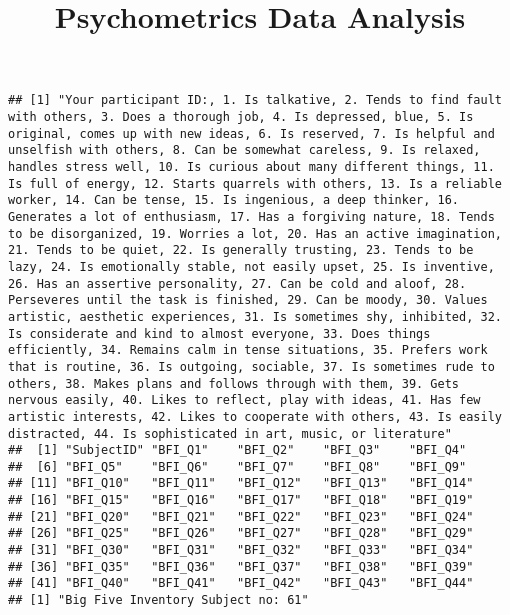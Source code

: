 \documentclass[]{article}
\title{Psychometrics Data Analysis}
\author{}
\date{}
\begin{document}
\maketitle

\newpage

\newpage

\begin{verbatim}
## [1] "Your participant ID:, 1. Is talkative, 2. Tends to find fault with others, 3. Does a thorough job, 4. Is depressed, blue, 5. Is original, comes up with new ideas, 6. Is reserved, 7. Is helpful and unselfish with others, 8. Can be somewhat careless, 9. Is relaxed, handles stress well, 10. Is curious about many different things, 11. Is full of energy, 12. Starts quarrels with others, 13. Is a reliable worker, 14. Can be tense, 15. Is ingenious, a deep thinker, 16. Generates a lot of enthusiasm, 17. Has a forgiving nature, 18. Tends to be disorganized, 19. Worries a lot, 20. Has an active imagination, 21. Tends to be quiet, 22. Is generally trusting, 23. Tends to be lazy, 24. Is emotionally stable, not easily upset, 25. Is inventive, 26. Has an assertive personality, 27. Can be cold and aloof, 28. Perseveres until the task is finished, 29. Can be moody, 30. Values artistic, aesthetic experiences, 31. Is sometimes shy, inhibited, 32. Is considerate and kind to almost everyone, 33. Does things efficiently, 34. Remains calm in tense situations, 35. Prefers work that is routine, 36. Is outgoing, sociable, 37. Is sometimes rude to others, 38. Makes plans and follows through with them, 39. Gets nervous easily, 40. Likes to reflect, play with ideas, 41. Has few artistic interests, 42. Likes to cooperate with others, 43. Is easily distracted, 44. Is sophisticated in art, music, or literature"
##  [1] "SubjectID" "BFI_Q1"    "BFI_Q2"    "BFI_Q3"    "BFI_Q4"   
##  [6] "BFI_Q5"    "BFI_Q6"    "BFI_Q7"    "BFI_Q8"    "BFI_Q9"   
## [11] "BFI_Q10"   "BFI_Q11"   "BFI_Q12"   "BFI_Q13"   "BFI_Q14"  
## [16] "BFI_Q15"   "BFI_Q16"   "BFI_Q17"   "BFI_Q18"   "BFI_Q19"  
## [21] "BFI_Q20"   "BFI_Q21"   "BFI_Q22"   "BFI_Q23"   "BFI_Q24"  
## [26] "BFI_Q25"   "BFI_Q26"   "BFI_Q27"   "BFI_Q28"   "BFI_Q29"  
## [31] "BFI_Q30"   "BFI_Q31"   "BFI_Q32"   "BFI_Q33"   "BFI_Q34"  
## [36] "BFI_Q35"   "BFI_Q36"   "BFI_Q37"   "BFI_Q38"   "BFI_Q39"  
## [41] "BFI_Q40"   "BFI_Q41"   "BFI_Q42"   "BFI_Q43"   "BFI_Q44"  
## [1] "Big Five Inventory Subject no: 61"
\end{verbatim}
\end{document}
